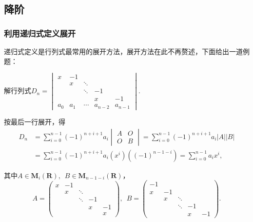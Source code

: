 \subsection{降阶}

\subsubsection{利用递归式定义展开}

递归式定义是行列式最常用的展开方法，展开方法在此不再赘述，下面给出一道例题：

\begin{example}{}{}
    解行列式$D_n=\begin{vmatrix}
            x     & -1    &        &         &         \\
                  & x     & \ddots &         &         \\
                  &       & \ddots & -1      &         \\
                  &       &        & x       & -1      \\
            a_{0} & a_{1} & \cdots & a_{n-2} & a_{n-1}
        \end{vmatrix}$.
\end{example}

\begin{solution}
    按最后一行展开，得
    \begin{align*}
        D_n & =\sum_{i=0}^{n-1}(-1)^{n+i+1}a_i\begin{vmatrix} A & O \\ O & B \end{vmatrix}
        =\sum_{i=0}^{n-1}(-1)^{n+i+1}a_i|A||B|                                                        \\
            & =\sum_{i=0}^{n-1}(-1)^{n+i+1}a_i(x^i)\left((-1)^{n-1-i}\right) =\sum_{i=0}^{n-1}a_i x^i,
    \end{align*}

    其中$A\in \mathbf{M}_i(\mathbf{R}),\enspace B\in \mathbf{M}_{n-1-i}(\mathbf{R})$，
    \[ A=\begin{pmatrix}
            x & -1 &        &    &    \\
              & x  & \ddots &    &    \\
              &    & \ddots & -1 &    \\
              &    &        & x  & -1 \\
              &    &        &    & x
        \end{pmatrix},\enspace
        B=\begin{pmatrix}
            -1 &    &        &    &    \\
            x  & -1 &        &    &    \\
               & x  & \ddots &    &    \\
               &    & \ddots & -1 &    \\
               &    &        & x  & -1
        \end{pmatrix}. \]
\end{solution}

